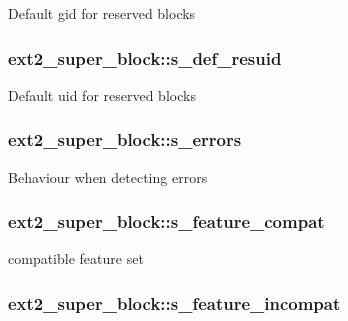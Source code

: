 Default gid for reserved blocks \hypertarget{structext2__super__block_a83da108c4a1f27a275f54970fb8edf07}{
\subsubsection[{s\-\_\-def\-\_\-resuid}]{ ext2\-\_\-super\-\_\-block\-::s\-\_\-def\-\_\-resuid}}\label{structext2__super__block_a83da108c4a1f27a275f54970fb8edf07}
Default uid for reserved blocks \hypertarget{structext2__super__block_a06e31d621f6250d56d1af5c342220a08}{
\subsubsection[{s\-\_\-errors}]{ ext2\-\_\-super\-\_\-block\-::s\-\_\-errors}}\label{structext2__super__block_a06e31d621f6250d56d1af5c342220a08}
Behaviour when detecting errors \hypertarget{structext2__super__block_a1cf404a1bcfb748e924c62032cd723a5}{
\subsubsection[{s\-\_\-feature\-\_\-compat}]{ ext2\-\_\-super\-\_\-block\-::s\-\_\-feature\-\_\-compat}}\label{structext2__super__block_a1cf404a1bcfb748e924c62032cd723a5}
compatible feature set \hypertarget{structext2__super__block_a56005d1ae97dc32f86567d018c753440}{
\subsubsection[{s\-\_\-feature\-\_\-incompat}]{ ext2\-\_\-super\-\_\-block\-::s\-\_\-feature\-\_\-incompat}}\label{structext2__super__block_a56005d1ae97dc32f86567d018c753440}
